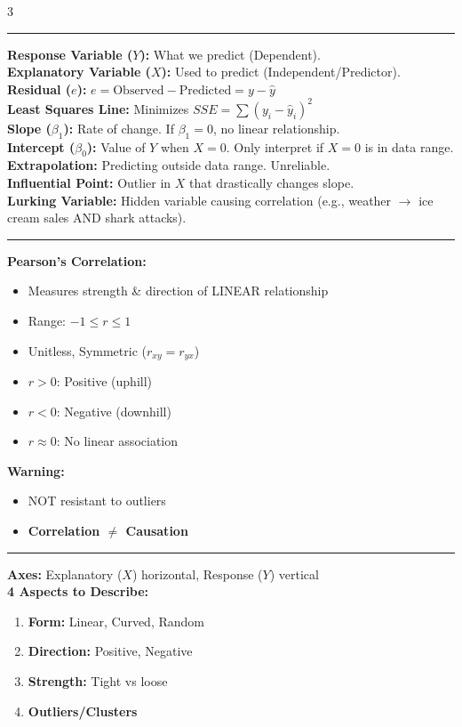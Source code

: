 \documentclass[7pt, letterpaper]{article}
\newcommand{\sectionhead}[1]{%
    \vspace{0.5mm}{\normalsize\bfseries#1}\vspace{0mm}\hrule\vspace{0.5mm}%
}
\begin{document}
\begin{multicols}{3}
\small

\sectionhead{Key Definitions}
\textbf{Response Variable ($Y$):} What we predict (Dependent). \\
\textbf{Explanatory Variable ($X$):} Used to predict (Independent/Predictor). \\
\textbf{Residual ($e$):} $e = \text{Observed} - \text{Predicted} = y - \hat{y}$ \\
\textbf{Least Squares Line:} Minimizes $SSE = \sum (y_i - \hat{y}_i)^2$ \\
\textbf{Slope ($\beta_1$):} Rate of change. If $\beta_1 = 0$, no linear relationship. \\
\textbf{Intercept ($\beta_0$):} Value of $Y$ when $X=0$. Only interpret if $X=0$ is in data range. \\
\textbf{Extrapolation:} Predicting outside data range. Unreliable. \\
\textbf{Influential Point:} Outlier in $X$ that drastically changes slope. \\
\textbf{Lurking Variable:} Hidden variable causing correlation (e.g., weather $\to$ ice cream sales AND shark attacks).

\sectionhead{Correlation ($r$)}
\textbf{Pearson's Correlation:}
\begin{itemize}
    \item Measures strength \& direction of LINEAR relationship
    \item Range: $-1 \le r \le 1$
    \item Unitless, Symmetric ($r_{xy} = r_{yx}$)
    \item $r > 0$: Positive (uphill)
    \item $r < 0$: Negative (downhill)
    \item $r \approx 0$: No linear association
\end{itemize}
\textbf{Warning:}
\begin{itemize}
    \item NOT resistant to outliers
    \item \textbf{Correlation $\ne$ Causation}
\end{itemize}

\sectionhead{Scatterplots}
\textbf{Axes:} Explanatory ($X$) horizontal, Response ($Y$) vertical \\
\textbf{4 Aspects to Describe:}
\begin{enumerate}
    \item \textbf{Form:} Linear, Curved, Random
    \item \textbf{Direction:} Positive, Negative
    \item \textbf{Strength:} Tight vs loose
    \item \textbf{Outliers/Clusters}
\end{enumerate}


\end{multicols}
\end{document}
